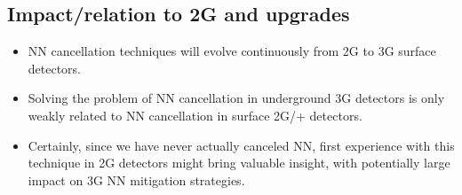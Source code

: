 \subsection{Impact/relation to 2G and upgrades}
\begin{itemize}
\item NN cancellation techniques will evolve continuously from 2G to 3G surface detectors. 
\item Solving the problem of NN cancellation in underground 3G detectors is only weakly related to NN cancellation in surface 2G/+ detectors. 
\item Certainly, since we have never actually canceled NN, first experience with this technique in 2G detectors might bring valuable insight, with potentially large impact on 3G NN mitigation strategies.
\end{itemize}
